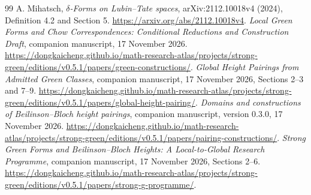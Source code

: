 \documentclass[11pt,a4paper]{article}
\theoremstyle{definition}
\numberwithin{equation}{section}
\begin{document}
\begin{thebibliography}{99}
 A. Mihatsch, \emph{$\delta$-Forms on Lubin--Tate spaces}, arXiv:2112.10018v4 (2024), Definition 4.2 and Section 5. \url{https://arxiv.org/abs/2112.10018v4}.
 \emph{Local Green Forms and Chow Correspondences: Conditional Reductions and Construction Draft}, companion manuscript, 17 November 2026. \url{https://dongkaicheng.github.io/math-research-atlas/projects/strong-green/editions/v0.5.1/papers/green-constructions/}.
 \emph{Global Height Pairings from Admitted Green Classes}, companion manuscript, 17 November 2026, Sections 2--3 and 7--9. \url{https://dongkaicheng.github.io/math-research-atlas/projects/strong-green/editions/v0.5.1/papers/global-height-pairing/}.
 \emph{Domains and constructions of Beilinson--Bloch height pairings}, companion manuscript, version 0.3.0, 17 November 2026. \url{https://dongkaicheng.github.io/math-research-atlas/projects/strong-green/editions/v0.5.1/papers/pairing-constructions/}.
 \emph{Strong Green Forms and Beilinson--Bloch Heights: A Local-to-Global Research Programme}, companion manuscript, 17 November 2026, Sections 2--6. \url{https://dongkaicheng.github.io/math-research-atlas/projects/strong-green/editions/v0.5.1/papers/strong-g-programme/}.
\end{thebibliography}
\end{document}

